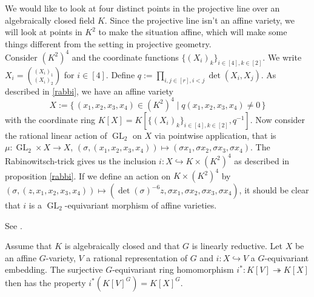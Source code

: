 \begin{dexample}\label{domcr}
  We would like to look at four distinct points in the projective line over an algebraically closed field $K$.
  Since the projective line isn't an affine variety, we will look at points in $K^2$ to make the situation affine, which will make some things different from the setting in projective geometry.\\
  Consider $(K^2)^4$ and the coordinate functions $\{(X_i)_k\}_{i \in [4], k \in [2]}$.
  We write $X_i = \binom{(X_i)_1}{(X_i)_2}$ for $i \in [4]$.
  Define $q := \prod_{i,j \in [r], i<j} \operatorname{det}(X_i,X_j)$.
  As described in \ref{rabbi}, we have an affine variety
  \begin{equation}
    X := \{\, (x_1,x_2,x_3,x_4) \in (K^2)^4 \mid q(x_1,x_2,x_3,x_4) \neq 0 \,\}
  \end{equation}
  with the coordinate ring $K[X] = K[\{(X_i)_k\}_{i \in [4], k \in [2]},q^{-1}]$.
  Now consider the rational linear action of $\operatorname{GL}_2$ on $X$ via pointwise application, that is $\mu \colon \operatorname{GL}_2 \times X \rightarrow X$, $(\sigma,(x_1,x_2,x_3,x_4)) \mapsto (\sigma x_1,\sigma x_2,\sigma x_3,\sigma x_4)$.
  The Rabinowitsch-trick gives us the inclusion $i \colon X \hookrightarrow K \times (K^2)^4$ as described in proposition \ref{rabbi}.
  If we define an action on $K \times (K^2)^4$ by $(\sigma,(z,x_1,x_2,x_3,x_4)) \mapsto (\operatorname{det}(\sigma)^{-6}z,\sigma x_1,\sigma x_2,\sigma x_3,\sigma x_4)$, it should be clear that $i$ is a $\operatorname{GL}_2$-equivariant morphism of affine varieties.
\end{dexample}

\begin{lemma}\label{foremb}
  See \cite[2.2.9]{DK15}.
  
  Assume that $K$ is algebraically closed and that $G$ is linearly reductive.
  Let $X$ be an affine $G$-variety, $V$ a rational representation of $G$ and $i \colon X \hookrightarrow V$ a $G$-equivariant embedding.
  The surjective $G$-equivariant ring homomorphism $i^\ast \colon K[V] \twoheadrightarrow K[X]$ then has the property $i^\ast (K[V]^G) = K[X]^G$.
\end{lemma}


